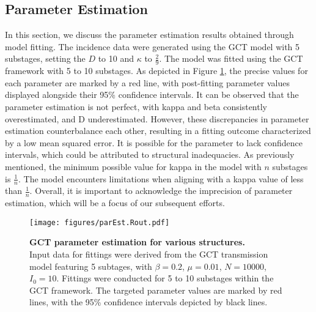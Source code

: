 \documentclass[12pt]{article}
\begin{document}
\subsection{Parameter Estimation}
In this section, we discuss the parameter estimation results obtained through model fitting. The incidence data were generated using the GCT model with 5 substages, setting the $D$ to 10 and $\kappa$ to $\frac{2}{9}$. The model was fitted using the GCT framework with 5 to 10 substages. As depicted in Figure \ref{parEst}, the precise values for each parameter are marked by a red line, with post-fitting parameter values displayed alongside their 95\% confidence intervals. It can be observed that the parameter estimation is not perfect, with kappa and beta consistently overestimated, and D underestimated. However, these discrepancies in parameter estimation counterbalance each other, resulting in a fitting outcome characterized by a low mean squared error. It is possible for the parameter to lack confidence intervals, which could be attributed to structural inadequacies. As previously mentioned, the minimum possible value for kappa in the model with $n$ substages is $\frac{1}{n}$. The model encounters limitations when aligning with a kappa value of less than $\frac{1}{n}$. Overall, it is important to acknowledge the imprecision of parameter estimation, which will be a focus of our subsequent efforts.

\begin{figure}[h!]
    \centering
    \texttt{[image: figures/parEst.Rout.pdf]}
    \caption{\textbf{GCT parameter estimation for various structures.} \\ Input data for fittings were derived from the GCT transmission model featuring 5 subtages, with $\beta=0.2$, $\mu=0.01$, $N=10000$, $I_0=10$. Fittings were conducted for 5 to 10 substages within the GCT framework. The targeted parameter values are marked by red lines, with the 95\% confidence intervals depicted by black lines.}
    \label{parEst}
\end{figure}
\end{document}
